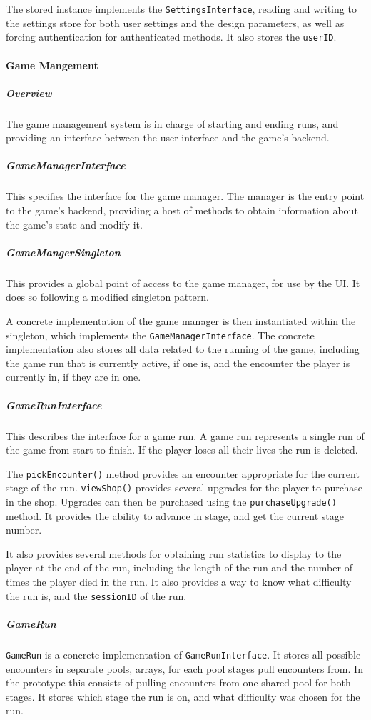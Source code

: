 The stored instance implements the \texttt{SettingsInterface}, reading and writing to the settings store for both user settings and the design parameters, as well as forcing authentication for authenticated methods. It also stores the \texttt{userID}.

\paragraph{Game Mangement}

\subparagraph{Overview}
The game management system is in charge of starting and ending runs, and providing an interface between the user interface and the game's backend.

\subparagraph{GameManagerInterface}
This specifies the interface for the game manager. The manager is the entry point to the game's backend, providing a host of methods to obtain information about the game's state and modify it.

\subparagraph{GameMangerSingleton}
This provides a global point of access to the game manager, for use by the UI. It does so following a modified singleton pattern.

A concrete implementation of the game manager is then instantiated within the singleton, which implements the \texttt{GameManagerInterface}. The concrete implementation also stores all data related to the running of the game, including the game run that is currently active, if one is, and the encounter the player is currently in, if they are in one.

\subparagraph{GameRunInterface}
This describes the interface for a game run. A game run represents a single run of the game from start to finish. If the player loses all their lives the run is deleted.

The \texttt{pickEncounter()} method provides an encounter appropriate for the current stage of the run. \texttt{viewShop()} provides several upgrades for the player to purchase in the shop. Upgrades can then be purchased using the \texttt{purchaseUpgrade()} method. It provides the ability to advance in stage, and get the current stage number.

It also provides several methods for obtaining run statistics to display to the player at the end of the run, including the length of the run and the number of times the player died in the run. It also provides a way to know what difficulty the run is, and the \texttt{sessionID} of the run.

\subparagraph{GameRun}
\texttt{GameRun} is a concrete implementation of \texttt{GameRunInterface}. It stores all possible encounters in separate pools, arrays, for each pool stages pull encounters from. In the prototype this consists of pulling encounters from one shared pool for both stages. It stores which stage the run is on, and what difficulty was chosen for the run.

